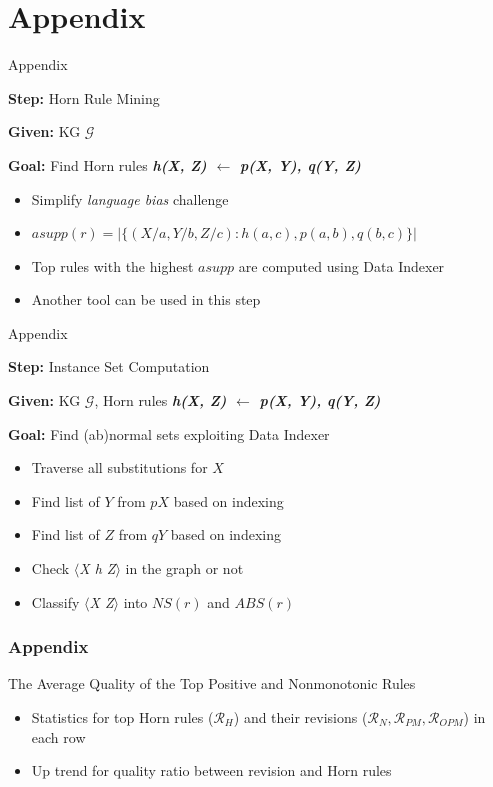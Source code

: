 \documentclass{beamer}
\def\cG{\ensuremath{\mathcal{G}}}
\def\cR{\ensuremath{\mathcal{R}}}
\begin{document}
\section{Appendix}
\begin{frame}{Appendix}

\textbf{Step:} Horn Rule Mining~\cite{rumis}
\smallskip

\textbf{Given:} KG $\cG$
\smallskip

\textbf{Goal:} Find Horn rules \textit{\textbf{h(X, Z) $\leftarrow$ p(X, Y), q(Y, Z)}}
\smallskip
\begin{itemize}
	\item Simplify \textit{language bias} challenge
	\item $asupp(r)=|\{(X/a, Y/b, Z/c):h(a, c),p(a, b),q(b, c)\}|$
	\item Top rules with the highest $asupp$ are computed using Data Indexer
	\item Another tool can be used in this step
\end{itemize}

\end{frame}

\begin{frame}{Appendix}

\textbf{Step:} Instance Set Computation
\smallskip

\textbf{Given:} KG $\cG$, Horn rules \textit{\textbf{h(X, Z) $\leftarrow$ p(X, Y), q(Y, Z)}}

\smallskip
\textbf{Goal:} Find (ab)normal sets exploiting Data Indexer
\begin{itemize}
	\item Traverse all substitutions for $X$
	\item Find list of $Y$ from $pX$ based on indexing
	\item Find list of $Z$ from $qY$ based on indexing
	\item Check \textit{$\langle$X h Z$\rangle$} in the graph or not
	\item Classify \textit{$\langle$X Z$\rangle$} into $NS(r)$ and $ABS(r)$
\end{itemize}

\end{frame}

\begin{frame}\frametitle{Appendix}

\begin{table}[ht]
\centering
\footnotesize
\renewcommand*{\arraystretch}{1.07}
\centering

\caption{The Average Quality of the Top Positive and Nonmonotonic Rules}
\label{tab:rules_quality}
\end{table}

\begin{itemize}
\item Statistics for top Horn rules ($\cR_H$) and their revisions ($\cR_N, \cR_{PM}, \cR_{OPM}$) in each row
\item Up trend for quality ratio between revision and Horn rules
\end{itemize}

\end{frame}
\end{document}

